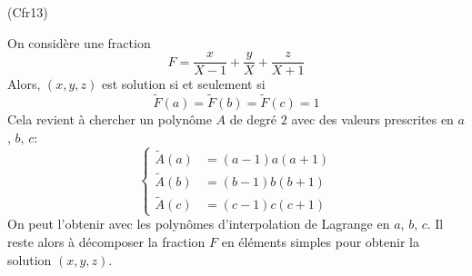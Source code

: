 \begin{tiny}(Cfr13)\end{tiny} On considère une fraction
\begin{displaymath}
  F = \frac{x}{X-1}+\frac{y}{X}+\frac{z}{X+1}
\end{displaymath}
Alors, $(x,y,z)$ est solution si et seulement si
\begin{displaymath}
  \widetilde{F}(a)=\widetilde{F}(b)=\widetilde{F}(c)=1
\end{displaymath}
Cela revient à chercher un polynôme $A$ de degré $2$ avec des valeurs prescrites en $a$, $b$, $c$:
\begin{displaymath}
  \left\lbrace 
\begin{aligned}
  \widetilde{A}(a) &= (a-1)a(a+1)\\
  \widetilde{A}(b) &= (b-1)b(b+1)\\
  \widetilde{A}(c) &= (c-1)c(c+1)
\end{aligned}
\right. 
\end{displaymath}
On peut l'obtenir avec les polynômes d'interpolation de Lagrange en $a$, $b$, $c$. Il reste alors à décomposer la fraction $F$ en éléments simples pour obtenir la solution $(x,y,z)$.